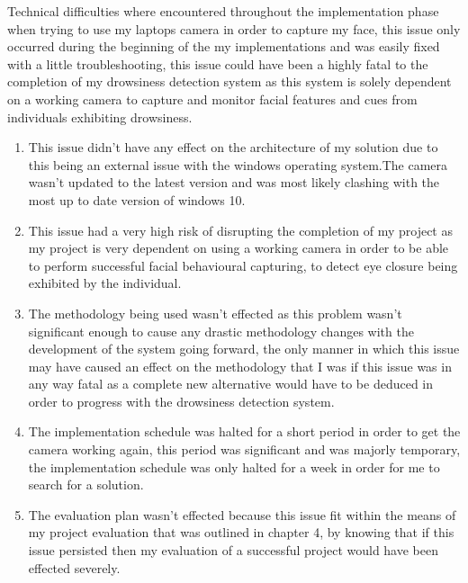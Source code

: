 \item Technical difficulties where encountered throughout the implementation phase when trying to use my laptops camera in order to capture my face, this issue only occurred during the beginning of the my implementations and was easily fixed with a little troubleshooting, this issue could have been a highly fatal to the completion of my drowsiness detection system as this system is solely dependent on a working camera to capture and monitor facial features and cues from individuals exhibiting drowsiness.
  \begin{enumerate}
  \item This issue didn't have any effect on the architecture of my solution due to this being an external issue with the windows operating system.The camera wasn't updated to the latest version and was most likely clashing with the most up to date version of windows 10.
 \item This issue had a very high risk of disrupting the completion of my project as my project is very dependent on using a working camera in order to be able to perform successful facial behavioural capturing, to detect eye closure being exhibited by the individual.                                     		\item The methodology being used wasn't effected as this problem wasn't significant enough to cause any drastic methodology changes with the development of the system going forward, the only manner in which this issue may have caused an effect on the methodology that I was if this issue was in any way fatal as a complete new alternative would have to be deduced in order to progress with the drowsiness detection system. 		\item The implementation schedule was halted for a short period in order to get the camera working again, this period was significant and was majorly temporary, the implementation schedule was only halted for a week in order for me to search for a solution.                                                      
 \item The evaluation plan wasn't effected because this issue fit within the means of my project evaluation that was outlined in chapter 4, by knowing that if this issue persisted then my evaluation of a successful project would have been effected severely.															 

\end{enumerate}
